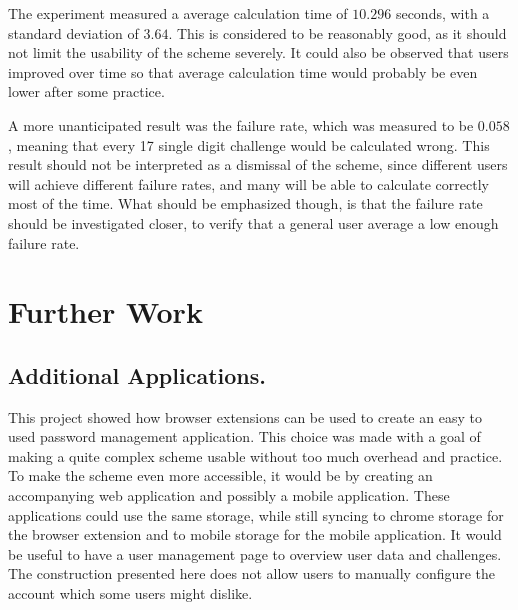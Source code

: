\par The experiment measured a average calculation time of $10.296$ seconds, with a standard deviation of $3.64$. This is considered to be reasonably good, as it should not limit the usability of the scheme severely. It could also be observed that users improved over time so that average calculation time would probably be even lower after some practice. 
\par A more unanticipated result was the failure rate, which was measured to be $0.058$, meaning that every 17 single digit challenge would be calculated wrong. This result should not be interpreted as a dismissal of the scheme, since different users will achieve different failure rates, and many will be able to calculate correctly most of the time. What should be emphasized though, is that the failure rate should be investigated closer, to verify that a general user average a low enough failure rate. 


\section{Further Work}

\subsection{Additional Applications.}
This project showed how browser extensions can be used to create an easy to used password management application. This choice was made with a goal of making a quite complex scheme usable without too much overhead and practice. To make the scheme even more accessible, it would be by creating an accompanying web application and possibly a mobile application. These applications could use the same storage, while still syncing to chrome storage for the browser extension and to mobile storage for the mobile application. It would be useful to have a user management page to overview user data and challenges. The construction presented here does not allow users to manually configure the account which some users might dislike. 


